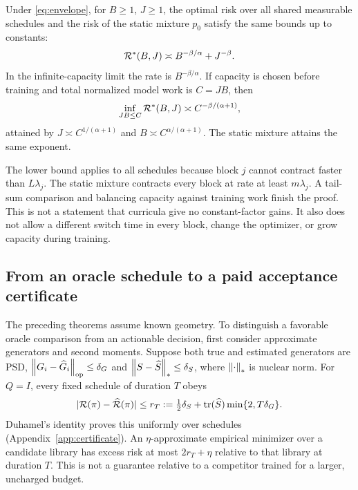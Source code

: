 \begin{theorem}\label{thm:spectral}
Under \eqref{eq:envelope}, for $B\ge1$, $J\ge1$, the optimal risk over all shared measurable schedules and the risk of the static mixture $p_0$ satisfy the same bounds up to constants:
\begin{equation}
 \mathcal R^*(B,J)\asymp B^{-\beta/\alpha}+J^{-\beta}.
\end{equation}
In the infinite-capacity limit the rate is $B^{-\beta/\alpha}$. If capacity is chosen before training and total normalized model work is $C=JB$, then
\begin{equation}
 \inf_{JB\le C}\mathcal R^*(B,J)\asymp C^{-\beta/(\alpha+1)},\label{eq:capacity}
\end{equation}
attained by $J\asymp C^{1/(\alpha+1)}$ and $B\asymp C^{\alpha/(\alpha+1)}$. The static mixture attains the same exponent.
\end{theorem}
The lower bound applies to all schedules because block $j$ cannot contract faster than $L\lambda_j$. The static mixture contracts every block at rate at least $m\lambda_j$. A tail-sum comparison and balancing capacity against training work finish the proof. This is not a statement that curricula give no constant-factor gains. It also does not allow a different switch time in every block, change the optimizer, or grow capacity during training.



\subsection{From an oracle schedule to a paid acceptance certificate}\label{sec:certificate}
The preceding theorems assume known geometry. To distinguish a favorable oracle comparison from an actionable decision, first consider approximate generators and second moments. Suppose both true and estimated generators are PSD, $\left\lVert G_i-\widehat G_i\right\rVert_{\mathrm{op}}\le\delta_G$ and $\left\lVert S-\widehat S\right\rVert_*\le\delta_S$, where $\left\lVert\cdot\right\rVert_*$ is nuclear norm. For $Q=I$, every fixed schedule of duration $T$ obeys
\begin{equation}
 |\mathcal R(\pi)-\widehat{\mathcal R}(\pi)|\le
 r_T:=\tfrac12\delta_S+\operatorname{tr}(\widehat S)\min\{2,T\delta_G\}.\label{eq:uniform}
\end{equation}
Duhamel's identity proves this uniformly over schedules (Appendix~\ref{app:certificate}). An $\eta$-approximate empirical minimizer over a candidate library has excess risk at most $2r_T+\eta$ relative to that library at duration $T$. This is not a guarantee relative to a competitor trained for a larger, uncharged budget.

